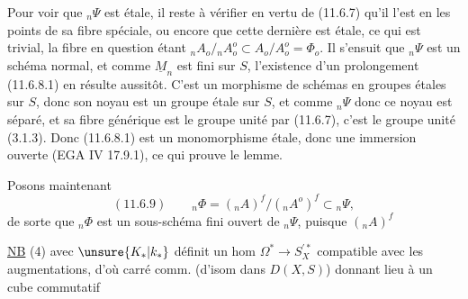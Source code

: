 Pour voir que $ {}_n\Psi$ est étale, il reste à vérifier en vertu de (11.6.7) qu'il l'est en les points de sa fibre spéciale, ou encore que cette dernière est étale, ce qui est trivial, la fibre en question étant
$ {}_n A_o/{}_n A_o^o\subset A_o/A_o^o=\Phi_o$.
Il s'ensuit que $ {}_n\Psi$ est un schéma normal, et comme $\underline M_n$ est fini sur $S$, l'existence d'un prolongement (11.6.8.1) en résulte aussitôt. C'est un morphisme de schémas en groupes étales sur $S$, donc son noyau est un groupe étale sur $S$, et comme $ {}_n\Psi$ donc ce noyau est séparé, et sa fibre générique est le groupe unité par (11.6.7), c'est le groupe unité (3.1.3). Donc (11.6.8.1) est un monomorphisme étale, donc une immersion ouverte (EGA IV 17.9.1), ce qui prouve le lemme.

Posons maintenant
\[
(11.6.9)\qquad {}_n\Phi=({}_n A)^f/({}_n A^o)^f\subset{}_n\Psi,
\]
de sorte que $ {}_n\Phi$ est un sous-schéma fini ouvert de $ {}_n\Psi$, puisque $({}_n A)^f$




\uline{NB}  (4)  avec
$\unsure{K_*|k_*}$ définit un hom
$\Omega^*\longrightarrow S_X^{\prime *}$ compatible avec les augmentations,
d'où carré comm.
(d'isom dans $D(X,S)$) donnant lieu à un cube commutatif

